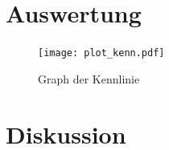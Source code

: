 
\section{Auswertung}

\begin{figure}[H]
\centering
\texttt{[image: plot\_kenn.pdf]}
\caption{Graph der Kennlinie}
\label{fig:a}
\end{figure}


\section{Diskussion}



\newpage
\printbibliography

